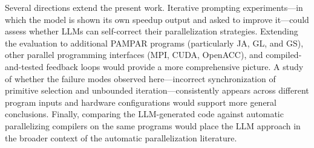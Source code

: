 \documentclass[conference]{IEEEtran}
\begin{document}

Several directions extend the present work. 
Iterative prompting experiments—in which the model is shown its own speedup output and asked to improve it—could assess whether LLMs can self-correct their parallelization strategies. 
Extending the evaluation to additional PAMPAR programs (particularly JA, GL, and GS), other parallel programming interfaces (MPI, CUDA, OpenACC), and compiled-and-tested feedback loops would provide a more comprehensive picture. 
A study of whether the failure modes observed here—incorrect synchronization of primitive selection and unbounded iteration—consistently appears across different program inputs and hardware configurations would support more general conclusions. 
Finally, comparing the LLM-generated code against automatic parallelizing compilers on the same programs would place the LLM approach in the broader context of the automatic parallelization literature.
\end{document}
